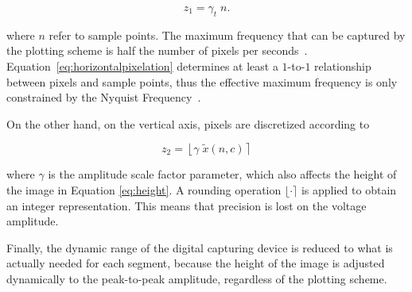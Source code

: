 \begin{equation}
z_1 = \gamma_t  \; n.
\label{eq:horizontalpixelation}
\end{equation}

\noindent where $n$ refer to sample points. The maximum frequency that can be captured by the plotting scheme is half the number of pixels per seconds~\cite{Schomer2010}.  Equation~\ref{eq:horizontalpixelation} determines at least a $1$-to-$1$ relationship between pixels and sample points, thus the effective maximum frequency is only constrained by the Nyquist Frequency~\cite{Oppenheim2009}. 

On the other hand, on the vertical axis, pixels are discretized according to

\begin{equation}
z_2 = \left \lfloor{ \gamma  \; \tilde{x}(n,c)  }\right \rceil
\label{eq:verticalpixelation}
\end{equation}

\noindent where $\gamma$ is the amplitude scale factor parameter, which also affects the height of the image in Equation \ref{eq:height}. A rounding operation $\lfloor  \cdot \rceil$ is applied to obtain an integer representation.  This means that precision is lost on the voltage amplitude. 

Finally, the dynamic range of the digital capturing device is reduced to what is actually needed for each segment, because the height of the image is adjusted dynamically to the peak-to-peak amplitude, regardless of the plotting scheme.






